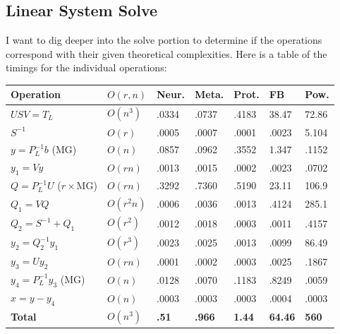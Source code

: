 \documentclass{article}
\begin{document}
\subsection{Linear System Solve}
I want to dig deeper into the solve portion to determine if the operations correspond with their given theoretical complexities. Here is a table of the timings for the individual operations:\\
\begin{spacing}{1}
\begin{center}
\renewcommand{\arraystretch}{1.5}
    \begin{tabular}{ | l | l | l | l | l | l | l |}
    \hline
    \textbf{Operation} & \textbf{$O(r,n)$} & \textbf{Neur.} & \textbf{Meta.} & \textbf{Prot.} & \textbf{FB} & \textbf{Pow.} \\ \hline
    $USV = T_L$ & $O(n^3)$ & .0334 & .0737 & .4183 & 38.47 & 72.86  \\ \hline
    $S^{-1}$ & $O(r)$ & .0005 & .0007 & .0001 & .0023 & 5.104 \\ \hline
    $y = P_L^{-1}b$ (MG) & $O(n)$ & .0857 & .0962 & .3552 & 1.347 & .1152  \\  \hline
    $y_1 = Vy$ & $O(rn)$ & .0013 & .0015 & .0002 & .0023 & .0702 \\ \hline
    $Q = P_L^{-1}U$ ($r\times$MG) & $O(rn)$ & .3292 & .7360 & .5190 & 23.11 & 106.9  \\ \hline
    $Q_1 = VQ$ & $O(r^2 n)$ & .0006 & .0036 & .0013 & .4124 & 285.1 \\ \hline
    $Q_2 = S^{-1} + Q_1$ & $O(r^2)$ & .0012 & .0018 & .0003 & .0011 & .4157 \\ \hline
    $y_2 = Q_2^{-1}y_1$ & $O(r^3)$ & .0023 & .0025 & .0013 & .0099 & 86.49 \\ \hline
    $y_3 = Uy_2$ & $O(rn)$ & .0001 & .0002 & .0003 & .0025 & .1867 \\ \hline
    $y_4 = P_L^{-1}y_3$ (MG) & $O(n)$ &.0128 & .0070 & .1183 & .8249 & .0059 \\ \hline
    $x = y - y_4$ & $O(n)$ &.0003 & .0003 & .0003 & .0004 & .0003 \\ \hline
    \textbf{Total} & \textbf{$O(n^3)$} & \textbf{.51} & \textbf{.966} & \textbf{1.44} & \textbf{64.46} & \textbf{560} \\
    \hline
    \end{tabular}
\end{center}
\end{spacing}
\end{document}
